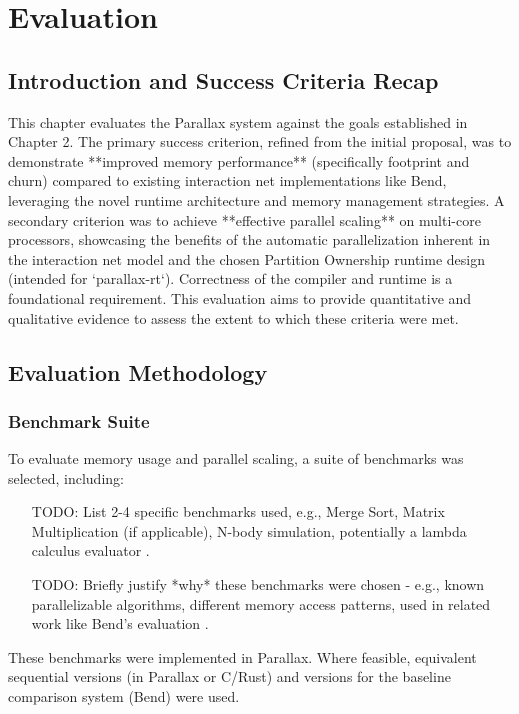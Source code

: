 \chapter{Evaluation}

\section{Introduction and Success Criteria Recap} %
This chapter evaluates the Parallax system against the goals established in Chapter 2. The primary success criterion, refined from the initial proposal, was to demonstrate **improved memory performance** (specifically footprint and churn) compared to existing interaction net implementations like Bend, leveraging the novel runtime architecture and memory management strategies. A secondary criterion was to achieve **effective parallel scaling** on multi-core processors, showcasing the benefits of the automatic parallelization inherent in the interaction net model and the chosen Partition Ownership runtime design (intended for `parallax-rt`). Correctness of the compiler and runtime is a foundational requirement. This evaluation aims to provide quantitative and qualitative evidence to assess the extent to which these criteria were met.

\section{Evaluation Methodology} %

\subsection{Benchmark Suite} %
To evaluate memory usage and parallel scaling, a suite of benchmarks was selected, including:
\begin{itemize}
    \item [TODO: List 2-4 specific benchmarks used, e.g., Merge Sort, Matrix Multiplication (if applicable), N-body simulation, potentially a lambda calculus evaluator]. 
    \item [TODO: Briefly justify *why* these benchmarks were chosen - e.g., known parallelizable algorithms, different memory access patterns, used in related work like Bend's evaluation].
\end{itemize}
These benchmarks were implemented in Parallax. Where feasible, equivalent sequential versions (in Parallax or C/Rust) and versions for the baseline comparison system (Bend) were used.

